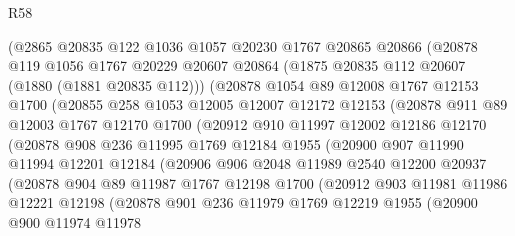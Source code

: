 \begin{lexlean}{R58}
\begin{coremodule}
          (@2865
            @20835
            @122
            @1036
            @1057
            @20230
            @1767
            @20865
            @20866
            (@20878
              @119
              @1056
              @1767
              @20229
              @20607
              @20864
              (@1875 @20835 @112 @20607 (@1880 (@1881 @20835 @112)))
              (@20878
                @1054
                @89
                @12008
                @1767
                @12153
                @1700
                (@20855
                  @258
                  @1053
                  @12005
                  @12007
                  @12172
                  @12153
                  (@20878
                    @911
                    @89
                    @12003
                    @1767
                    @12170
                    @1700
                    (@20912
                      @910
                      @11997
                      @12002
                      @12186
                      @12170
                      (@20878
                        @908
                        @236
                        @11995
                        @1769
                        @12184
                        @1955
                        (@20900
                          @907
                          @11990
                          @11994
                          @12201
                          @12184
                          (@20906
                            @906
                            @2048
                            @11989
                            @2540
                            @12200
                            @20937
                            (@20878
                              @904
                              @89
                              @11987
                              @1767
                              @12198
                              @1700
                              (@20912
                                @903
                                @11981
                                @11986
                                @12221
                                @12198
                                (@20878
                                  @901
                                  @236
                                  @11979
                                  @1769
                                  @12219
                                  @1955
                                  (@20900
                                    @900
                                    @11974
                                    @11978

\end{coremodule}
\end{lexlean}
